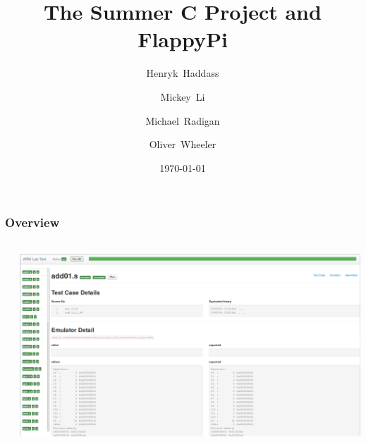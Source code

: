 \documentclass{beamer}
\title[FlappyPi]{The Summer C Project and FlappyPi} %
\author[Group 16]{\small Henryk~Haddass \and Mickey~Li \and Michael~Radigan \and Oliver~Wheeler}%
\institute[Imperial DoC] %
{
Group 16
\medskip
}
\date{\today} %
\begin{document}
\begin{frame}
\titlepage %

\end{frame}

\begin{frame}
\frametitle{Overview} %

\begin{columns}[T] %
     \begin{column}[T]{4cm} %
	\tableofcontents %
     \end{column}

     
     \begin{column}[T]{4cm} %
	\includegraphics[height=7cm,width=1\linewidth]{Images/Screen5.png}

     \end{column}
     
\end{columns}
\end{frame}

\end{document}
